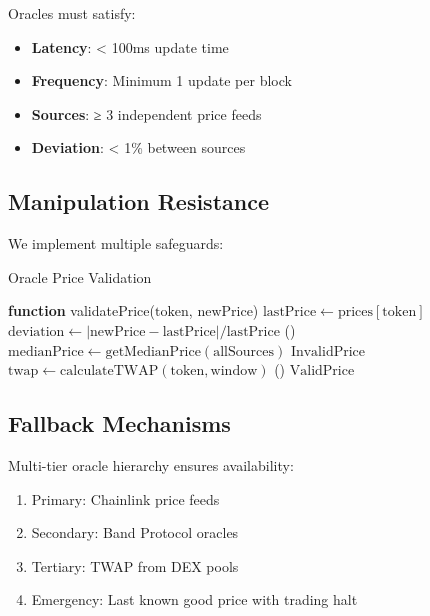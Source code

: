 \documentclass[11pt,a4paper]{article}
\begin{document}
Oracles must satisfy:
\begin{itemize}
    \item \textbf{Latency}: < 100ms update time
    \item \textbf{Frequency}: Minimum 1 update per block
    \item \textbf{Sources}: ≥ 3 independent price feeds
    \item \textbf{Deviation}: < 1\% between sources
\end{itemize}

\subsection{Manipulation Resistance}

We implement multiple safeguards:

\begin{algorithm}
\caption{Oracle Price Validation}
\begin{algorithmic}[1]
\STATE \textbf{function} validatePrice($\text{token}$, $\text{newPrice}$)
\STATE $\text{lastPrice} \gets \text{prices}[\text{token}]$
\STATE $\text{deviation} \gets |\text{newPrice} - \text{lastPrice}| / \text{lastPrice}$
    \STATE {}()
    \STATE $\text{medianPrice} \gets \text{getMedianPrice}(\text{allSources})$
        \RETURN $\text{InvalidPrice}$
    \ENDIF
\ENDIF
\STATE $\text{twap} \gets \text{calculateTWAP}(\text{token}, \text{window})$
    \STATE {}()
\ENDIF
\RETURN $\text{ValidPrice}$
\end{algorithmic}
\end{algorithm}

\subsection{Fallback Mechanisms}

Multi-tier oracle hierarchy ensures availability:

\begin{enumerate}
    \item Primary: Chainlink price feeds
    \item Secondary: Band Protocol oracles
    \item Tertiary: TWAP from DEX pools
    \item Emergency: Last known good price with trading halt
\end{enumerate}
\end{document}
